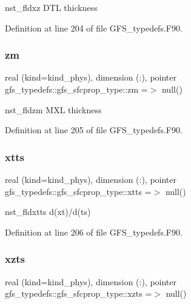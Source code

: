 nst\+\_\+fldxz D\+TL thickness 



Definition at line 204 of file G\+F\+S\+\_\+typedefs.\+F90.

\mbox{\label{structgfs__typedefs_1_1gfs__sfcprop__type_ae8f3509ab009fc18a69a8562f5d89209}} 
\subsubsection{zm}
{\footnotesize\ttfamily real (kind=kind\+\_\+phys), dimension     (\+:), pointer gfs\+\_\+typedefs\+::gfs\+\_\+sfcprop\+\_\+type\+::zm =$>$ null()}



nst\+\_\+fldzm M\+XL thickness 



Definition at line 205 of file G\+F\+S\+\_\+typedefs.\+F90.

\mbox{\label{structgfs__typedefs_1_1gfs__sfcprop__type_aed78fde75a7d3d00faeeba4c5f48c856}} 
\subsubsection{xtts}
{\footnotesize\ttfamily real (kind=kind\+\_\+phys), dimension   (\+:), pointer gfs\+\_\+typedefs\+::gfs\+\_\+sfcprop\+\_\+type\+::xtts =$>$ null()}



nst\+\_\+fldxtts d(xt)/d(ts) 



Definition at line 206 of file G\+F\+S\+\_\+typedefs.\+F90.

\mbox{\label{structgfs__typedefs_1_1gfs__sfcprop__type_a1cd8684cc45d48cae86bd34586f4bbe0}} 
\subsubsection{xzts}
{\footnotesize\ttfamily real (kind=kind\+\_\+phys), dimension   (\+:), pointer gfs\+\_\+typedefs\+::gfs\+\_\+sfcprop\+\_\+type\+::xzts =$>$ null()}



